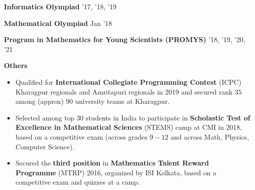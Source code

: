 \resumeProjectHeading
{\textbf{Informatics Olympiad}}
{'17, '18, '19}
{\resumeItemListStart
{}
\resumeItemListEnd}
\vspace{\gap}

\resumeProjectHeading
{\textbf{Mathematical Olympiad}}
{Jan '18}
{\resumeItemListStart
{}
\resumeItemListEnd}
\vspace{\gap}

\resumeProjectHeading
{\textbf{Program in Mathematics for Young Scientists (PROMYS)}}
{'18, '19, '20, '21}
{\resumeItemListStart
{}
\resumeItemListEnd}



\vspace{\gap}
\resumeProjectHeading
{\textbf{Others}}
{}
{
\item 
\begin{itemize}[itemsep=-4pt, parsep=5pt, leftmargin=0.5cm]
\item {}  Qualified for \textbf{International Collegiate Programming Contest} (ICPC) Kharagpur regionals and Amritapuri regionals in 2019 and secured rank $35$ among (approx) $90$ university teams at Kharagpur.
        \item Selected among top $30$ students in India to participate in \textbf{Scholastic Test of Excellence in Mathematical Sciences} (STEMS) camp at CMI in 2018, based on a competitive exam (across grades $9-12$ and across Math, Physics, Computer Science).
        \item Secured the \textbf{third position} in \textbf{Mathematics Talent Reward Programme} (MTRP) 2016, organized by ISI Kolkata, based on a competitive exam and quizzes at a camp.
\end{itemize}}
\resumeSubHeadingListEnd
\vspace{-15pt}








